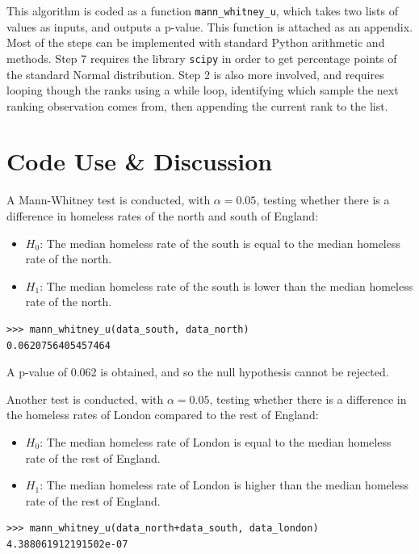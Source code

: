 \documentclass{article}
\begin{document}
This algorithm is coded as a function \texttt{mann\_whitney\_u}, which takes two
lists of values as inputs, and outputs a p-value.
This function is attached as an appendix.
Most of the steps can be implemented with standard Python arithmetic and
methods.
Step 7 requires the library \texttt{scipy} in order to get percentage points of
the standard Normal distribution.
Step 2 is also more involved, and requires looping though the ranks using a
while loop, identifying which sample the next ranking observation comes from,
then appending the current rank to the list.

\section{Code Use \& Discussion}

A Mann-Whitney test is conducted, with $\alpha=0.05$, testing whether there is
a difference in homeless rates of the north and south of England:

\begin{itemize}
  \setlength\itemsep{-0.5em}
  \item $H_0$: The median homeless rate of the south is equal to the median
  homeless rate of the north.
  \item $H_1$: The median homeless rate of the south is lower than the median
  homeless rate of the north.
\end{itemize}

\begin{verbatim}
>>> mann_whitney_u(data_south, data_north)
0.0620756405457464
\end{verbatim}

A p-value of 0.062 is obtained, and so the null hypothesis cannot be rejected.

Another test is conducted, with $\alpha = 0.05$, testing whether there is a
difference in the homeless rates of London compared to the rest of England:

\begin{itemize}
  \setlength\itemsep{-0.5em}
  \item $H_0$: The median homeless rate of London is equal to the median
  homeless rate of the rest of England.
  \item $H_1$: The median homeless rate of London is higher than the median
  homeless rate of the rest of England.
\end{itemize}

\begin{verbatim}
>>> mann_whitney_u(data_north+data_south, data_london)
4.388061912191502e-07
\end{verbatim}
\end{document}
